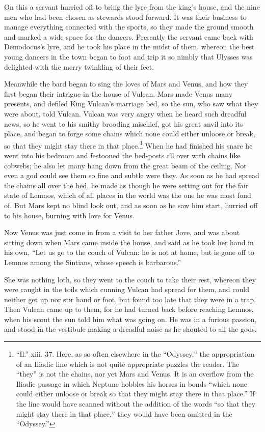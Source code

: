 On this a servant hurried off to bring the lyre from the king’s house, and the
nine men who had been chosen as stewards stood forward. It was their business
to manage everything connected with the sports, so they made the ground smooth
and marked a wide space for the dancers. Presently the servant came back with
Demodocus’s lyre, and he took his place in the midst of them, whereon the best
young dancers in the town began to foot and trip it so nimbly that Ulysses was
delighted with the merry twinkling of their feet.

Meanwhile the bard began to sing the loves of Mars and Venus, and how they
first began their intrigue in the house of Vulcan. Mars made Venus many
presents, and defiled King Vulcan’s marriage bed, so the sun, who saw what they
were about, told Vulcan. Vulcan was very angry when he heard such dreadful
news, so he went to his smithy brooding mischief, got his great anvil into its
place, and began to forge some chains which none could either unloose or break,
so that they might stay there in that place.\footnote{“Il.” xiii. 37. Here, as so often elsewhere in the “Odyssey,” the
appropriation of an Iliadic line which is not quite appropriate puzzles the
reader. The “they” is not the chains, nor yet Mars and Venus. It is an
overflow from the Iliadic passage in which Neptune hobbles his horses in bonds
“which none could either unloose or break so that they might stay there in
that place.” If the line would have scanned without the addition of the words
“so that they might stay there in that place,” they would have been omitted in
the “Odyssey.”} When he had finished his snare he
went into his bedroom and festooned the bed-posts all over with chains like
cobwebs; he also let many hang down from the great beam of the ceiling. Not
even a god could see them so fine and subtle were they. As soon as he had
spread the chains all over the bed, he made as though he were setting out for
the fair state of Lemnos, which of all places in the world was the one he was
most fond of. But Mars kept no blind look out, and as soon as he saw him start,
hurried off to his house, burning with love for Venus.

Now Venus was just come in from a visit to her father Jove, and was about
sitting down when Mars came inside the house, and said as he took her hand in
his own, “Let us go to the couch of Vulcan: he is not at home, but is gone off
to Lemnos among the Sintians, whose speech is barbarous.”

She was nothing loth, so they went to the couch to take their rest, whereon
they were caught in the toils which cunning Vulcan had spread for them, and
could neither get up nor stir hand or foot, but found too late that they were
in a trap. Then Vulcan came up to them, for he had turned back before reaching
Lemnos, when his scout the sun told him what was going on. He was in a furious
passion, and stood in the vestibule making a dreadful noise as he shouted to
all the gods.

